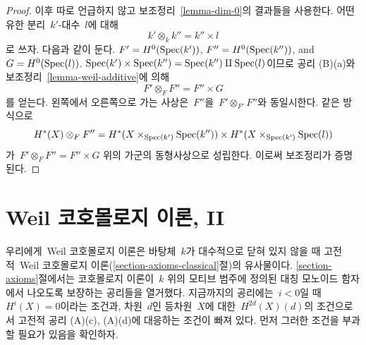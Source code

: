 \begin{proof}
이후 따로 언급하지 않고 보조정리\  \ref{lemma-dim-0}의 결과들을
사용한다. 어떤 유한 분리\  $k'$-대수\  $l$에 대해
$$
k' \otimes_k k'' = k'' \times l
$$
로 쓰자. 다음과 같이 둔다.
$F' = H^0(\mathop{\mathrm{Spec}}(k'))$, $F'' = H^0(\mathop{\mathrm{Spec}}(k''))$, and $G = H^0(\mathop{\mathrm{Spec}}(l))$.
$\mathop{\mathrm{Spec}}(k') \times \mathop{\mathrm{Spec}}(k'') = \mathop{\mathrm{Spec}}(k'') \amalg \mathop{\mathrm{Spec}}(l)$이므로
공리 (B)(a)와 보조정리\  \ref{lemma-weil-additive}에 의해
$$
F' \otimes_F F'' = F'' \times G
$$
를 얻는다. 왼쪽에서 오른쪽으로 가는 사상은\  $F''$을\ 
$F' \otimes_{F'} F''$와 동일시한다. 같은 방식으로
$$
H^*(X) \otimes_F F'' = H^*(X \times_{\mathop{\mathrm{Spec}}(k')} \mathop{\mathrm{Spec}}(k''))
\times H^*(X \times_{\mathop{\mathrm{Spec}}(k')} \mathop{\mathrm{Spec}}(l))
$$
가\  $F' \otimes_F F'' = F'' \times G$ 위의 가군의 동형사상으로
성립한다. 이로써 보조정리가 증명된다.
\end{proof}





















\section{Weil 코호몰로지 이론, II}
\label{section-old}

\noindent
우리에게\  Weil 코호몰로지 이론은 바탕체\  $k$가 대수적으로 닫혀 있지
않을 때 고전적\  Weil 코호몰로지 이론(\ref{section-axioms-classical}절)의
유사물이다. \ref{section-axioms}절에서는 코호몰로지 이론이\  $k$ 위의
모티브 범주에 정의된 대칭 모노이드 함자에서 나오도록 보장하는
공리들을 열거했다. 지금까지의 공리에는\  $i < 0$일 때\ 
$H^i(X) = 0$이라는 조건과, 차원\  $d$인 등차원\  $X$에 대한\ 
$H^{2d}(X)(d)$의 조건으로서 고전적 공리 (A)(c), (A)(d)에 대응하는
조건이 빠져 있다. 먼저 그러한 조건을 부과할 필요가 있음을
확인하자.


